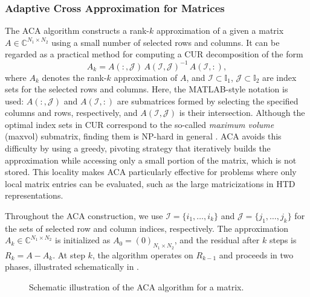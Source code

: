 \documentclass{article}
\theoremstyle{plain}
\theoremstyle{definition}
\theoremstyle{remark}
\begin{document}
\subsubsection{Adaptive Cross Approximation for Matrices}\label{sec:ACA}

The ACA algorithm constructs a rank-\( k \) approximation of a given a matrix \( A \in \mathbb{C}^{N_1 \times N_2} \) using a small number of selected rows and columns. It can be regarded as a practical method for computing a CUR decomposition of the form
\begin{equation}\label{eq:CUR}
    A_k = A(:, \mathcal{J})\, A(\mathcal{I}, \mathcal{J})^{-1}\, A(\mathcal{I}, :),
\end{equation}
where \( A_k \) denotes the rank-\( k \) approximation of \( A \), and \( \mathcal{I} \subset \mathbb{I}_1 \), \( \mathcal{J} \subset \mathbb{I}_2 \) are index sets for the selected rows and columns. Here, the MATLAB-style notation is used: \( A(:, \mathcal{J}) \) and \( A(\mathcal{I}, :) \) are submatrices formed by selecting the specified columns and rows, respectively, and \( A(\mathcal{I}, \mathcal{J}) \) is their intersection. Although the optimal index sets in CUR correspond to the so-called \emph{maximum volume} (maxvol) submatrix, finding them is NP-hard in general \cite{civril2007finding}. ACA avoids this difficulty by using a greedy, pivoting strategy that iteratively builds the approximation while accessing only a small portion of the matrix, which is not stored. This locality makes ACA particularly effective for problems where only local matrix entries can be evaluated, such as the large matricizations in HTD representations.

Throughout the ACA construction, we use \(\mathcal{I} = \{i_1, \dots, i_k\}\) and \(\mathcal{J} = \{j_1, \dots, j_k\}\) for the sets of selected row and column indices, respectively. The approximation \(A_k \in \mathbb{C}^{N_1 \times N_2}\) is initialized as \(A_0 = (0)_{N_1 \times N_2}\), and the residual after \(k\) steps is \(R_k = A - A_k\). At step \(k\), the algorithm operates on \(R_{k-1}\) and proceeds in two phases, illustrated schematically in .

\begin{figure}[htb]
	\begin{center}
	\end{center}
	\caption{Schematic illustration of the ACA algorithm for a matrix.}
	\label{fig:ACA_illustration}
\end{figure}
\end{document}
